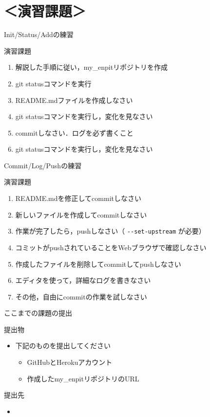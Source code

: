 \documentclass[t, aspectratio=169]{beamer}
\begin{document}
\section{＜演習課題＞}
\label{sec-2-4}
\begin{frame}[label=sec-2-4-1]{Init/Status/Addの練習}
\begin{block}{演習課題}
\begin{enumerate}
\item 解説した手順に従い，my\_enpitリポジトリを作成
\item git statusコマンドを実行
\item README.mdファイルを作成しなさい
\item git statusコマンドを実行し，変化を見なさい
\item commitしなさい．ログを必ず書くこと
\item git statusコマンドを実行し，変化を見なさい
\end{enumerate}
\end{block}
\end{frame}

\begin{frame}[fragile,label=sec-2-4-2]{Commit/Log/Pushの練習}
 \begin{block}{演習課題}
\begin{enumerate}
\item README.mdを修正してcommitしなさい
\item 新しいファイルを作成してcommitしなさい
\item 作業が完了したら，pushしなさい（ \texttt{-{}-set-upstream} が必要）
\item コミットがpushされていることをWebブラウザで確認しなさい
\item 作成したファイルを削除してcommitしてpushしなさい
\item エディタを使って，詳細なログを書きなさい
\item その他，自由にcommitの作業を試しなさい
\end{enumerate}
\end{block}
\end{frame}

\begin{frame}[label=sec-2-4-3]{ここまでの課題の提出}
\begin{block}{提出物}
\begin{itemize}
\item 下記のものを提出してください
\begin{itemize}
\item GitHubとHerokuアカウント
\item 作成したmy\_enpitリポジトリのURL
\end{itemize}
\end{itemize}
\end{block}

\begin{block}{提出先}
\begin{itemize}
\item\relax [\href{https://docs.google.com/forms/d/1SiKQqDLQw2YiJieYVS79ywpHIaNC3uI9cNPb_ddhC1Q/viewform?usp=send_form}{enPiT演習アカウント(2014)}]
\end{itemize}
\end{block}
\end{frame}
\end{document}
